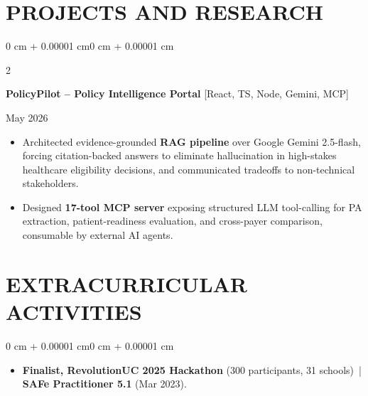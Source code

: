 \documentclass[10pt, letterpaper]{article}
\newenvironment{highlights}{
    \begin{itemize}[
        topsep=0.10 cm,
        parsep=0.06 cm,
        partopsep=0pt,
        itemsep=0.06 cm,
        leftmargin=12pt
    ]
}{
    \end{itemize}
}
\newenvironment{onecolentry}{
    \begin{adjustwidth}{0 cm + 0.00001 cm}{0 cm + 0.00001 cm}
}{
    \end{adjustwidth}
}
\newenvironment{twocolentry}[2][]{
    \onecolentry
    \def\secondColumn{#2}
    \setcolumnwidth{\fill, 4.5 cm}
    \begin{paracol}{2}
}{
    \switchcolumn \raggedleft \secondColumn
    \end{paracol}
    \endonecolentry
}
\begin{document}
\section{PROJECTS AND RESEARCH}
\begin{twocolentry}{May 2026}
\textbf{PolicyPilot -- Policy Intelligence Portal} [React, TS, Node, Gemini, MCP]
\end{twocolentry}
\begin{highlights}
  \item Architected evidence-grounded \textbf{RAG pipeline} over Google Gemini 2.5-flash, forcing citation-backed answers to eliminate hallucination in high-stakes healthcare eligibility decisions, and communicated tradeoffs to non-technical stakeholders.
  \item Designed \textbf{17-tool MCP server} exposing structured LLM tool-calling for PA extraction, patient-readiness evaluation, and cross-payer comparison, consumable by external AI agents.
\end{highlights}

\section{EXTRACURRICULAR ACTIVITIES}
\begin{onecolentry}
\begin{highlights}
  \item \textbf{Finalist, RevolutionUC 2025 Hackathon} (300 participants, 31 schools) \,|\, \textbf{SAFe Practitioner 5.1} (Mar 2023).
\end{highlights}
\end{onecolentry}
\end{document}
